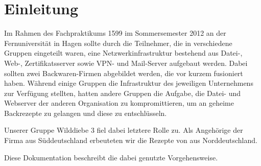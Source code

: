 \section{Einleitung}

Im Rahmen des Fachpraktikums 1599 im Sommersemester 2012 an der Fernuniversität
in Hagen sollte durch die Teilnehmer, die in verschiedene Gruppen eingeteilt
waren, eine Netzwerkinfrastruktur bestehend aus Datei-, Web-, Zertifikatsserver
sowie VPN- und Mail-Server aufgebaut werden. Dabei sollten zwei Backwaren-Firmen
abgebildet werden, die vor kurzem fusioniert haben. Während einige Gruppen die
Infrastruktur des jeweiligen Unternehmens zur Verfügung stellten, hatten andere
Gruppen die Aufgabe, die Datei- und Webserver der anderen Organisation zu
kompromittieren, um an geheime Backrezepte zu gelangen und diese zu
entschlüsseln.

Unserer Gruppe \glqq{}Wilddiebe 3\grqq{} fiel dabei letztere Rolle zu. Als Angehörige der
Firma \Muellerbrot{} aus Süddeutschland erbeuteten wir die Rezepte von
\Mayerbrot{} aus Norddeutschland.

Diese Dokumentation beschreibt die dabei genutzte Vorgehensweise.


